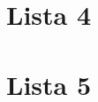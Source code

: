 \documentclass[svgnames]{report}
\begin{document}





\chapter{Lista 4}

\chapter{Lista 5}
\end{document}
